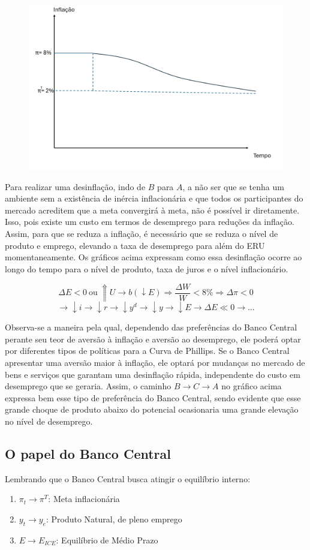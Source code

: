 \documentclass[a4paper,12pt]{article}[abntex2]
\begin{document}
\begin{figure}[H]
    \centering
    \includegraphics[width=0.7\linewidth]{Imagens/a10i4.png}
\end{figure}

Para realizar uma desinflação, indo de \( B \) para \( A \), a não ser que se tenha um ambiente sem a existência de inércia inflacionária e que todos os participantes do mercado acreditem que a meta convergirá à meta, não é possível ir diretamente. Isso, pois existe um custo em termos de desemprego para reduções da inflação. Assim, para que se reduza a inflação, é necessário que se reduza o nível de produto e emprego, elevando a taxa de desemprego para além do ERU momentaneamente. Os gráficos acima expressam como essa desinflação ocorre ao longo do tempo para o nível de produto, taxa de juros e o nível inflacionário.

\[
\Delta E < 0 \ \text{ou}\ \Uparrow U \rightarrow b(\downarrow E) 
\Rightarrow \frac{\Delta W}{W} < 8\% \Rightarrow \Delta \pi < 0 
\]
\[
\rightarrow \downarrow i \rightarrow \downarrow r \rightarrow \downarrow y^d 
\rightarrow \downarrow y \rightarrow \downarrow E \rightarrow \Delta E \ll 0 \rightarrow \ldots
\]


Observa-se a maneira pela qual, dependendo das preferências do Banco Central perante seu teor de aversão à inflação e aversão ao desemprego, ele poderá optar por diferentes tipos de políticas para a Curva de Phillips. Se o Banco Central apresentar uma aversão maior à inflação, ele optará por mudanças no mercado de bens e serviços que garantam uma desinflação rápida, independente do custo em desemprego que se geraria. Assim, o caminho \( B \rightarrow C \rightarrow A \) no gráfico acima expressa bem esse tipo de preferência do Banco Central, sendo evidente que esse grande choque de produto abaixo do potencial ocasionaria uma grande elevação no nível de desemprego.


\subsection{\textbf{O papel do Banco Central}}
Lembrando que o Banco Central busca atingir o equilíbrio interno: \begin{enumerate}
    \item \(\pi_t\rightarrow \pi^T\): Meta inflacionária
    \item \(y_t\rightarrow y_e\): Produto Natural, de pleno emprego 
    \item \(E\rightarrow E_{ICE}\): Equilíbrio de Médio Prazo
\end{enumerate}
\end{document}
